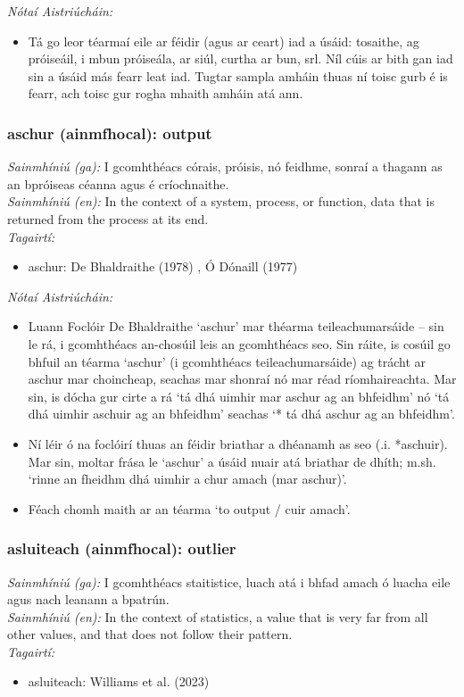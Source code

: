  \noindent \textit{Nótaí Aistriúcháin:}
\begin{itemize}
	\item Tá go leor téarmaí eile ar féidir (agus ar ceart) iad a úsáid: tosaithe, ag próiseáil, i mbun próiseála, ar siúl, curtha ar bun, srl. Níl cúis ar bith gan iad sin a úsáid más fearr leat iad. Tugtar sampla amháin thuas ní toisc gurb é is fearr, ach toisc gur rogha mhaith amháin atá ann.
\end{itemize}


\subsubsection*{aschur (ainmfhocal): output}
 \noindent \textit{Sainmhíniú (ga):} I gcomhthéacs córais, próisis, nó feidhme, sonraí a thagann as an bpróiseas céanna agus é críochnaithe.
\\
 \noindent \textit{Sainmhíniú (en):} In the context of a system, process, or function, data that is returned from the process at its end.
\\
 \noindent \textit{Tagairtí:}
\begin{itemize}
	\item aschur: De Bhaldraithe (1978) \cite{de-bhaldraithe}, Ó Dónaill (1977) \cite{odonaill}
\end{itemize}

 \noindent \textit{Nótaí Aistriúcháin:}
\begin{itemize}
	\item Luann Foclóir De Bhaldraithe `aschur' mar théarma teileachumarsáide -- sin le rá, i gcomhthéacs an-chosúil leis an gcomhthéacs seo. Sin ráite, is cosúil go bhfuil an téarma `aschur' (i gcomhthéacs teileachumarsáide) ag trácht ar aschur mar choincheap, seachas mar shonraí nó mar réad ríomhaireachta. Mar sin, is dócha gur cirte a rá `tá dhá uimhir mar aschur ag an bhfeidhm' nó `tá dhá uimhir aschuir ag an bhfeidhm' seachas `* tá dhá aschur ag an bhfeidhm'.
	\item Ní léir ó na foclóirí thuas an féidir briathar a dhéanamh as seo (.i. *aschuir). Mar sin, moltar frása le `aschur' a úsáid nuair atá briathar de dhíth; m.sh. `rinne an fheidhm dhá uimhir a chur amach (mar aschur)'.
	\item Féach chomh maith ar an téarma `to output / cuir amach'.
\end{itemize}


\subsubsection*{asluiteach (ainmfhocal): outlier}
 \noindent \textit{Sainmhíniú (ga):} I gcomhthéacs staitistice, luach atá i bhfad amach ó luacha eile agus nach leanann a bpatrún.
\\
 \noindent \textit{Sainmhíniú (en):} In the context of statistics, a value that is very far from all other values, and that does not follow their pattern.
\\
 \noindent \textit{Tagairtí:}
\begin{itemize}
	\item asluiteach: Williams et al. (2023) \cite{storchiste}
\end{itemize}

